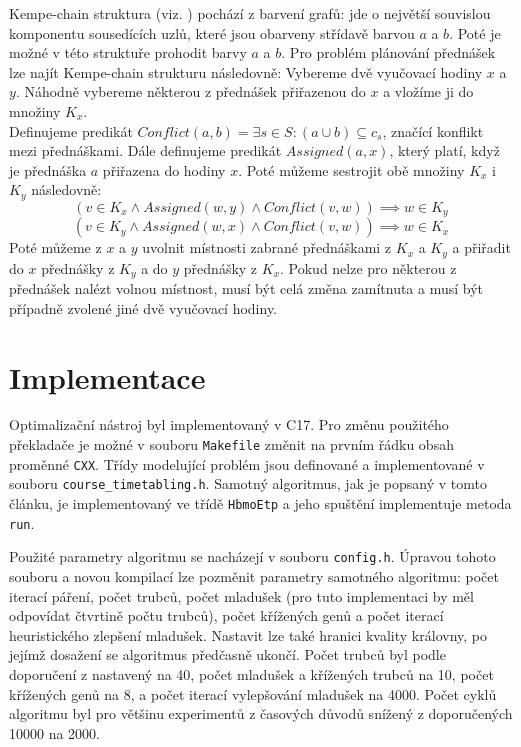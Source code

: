 \documentclass[12pt, a4paper]{article}
\def\CC{{C\nolinebreak[4]\hspace{-.05em}\raisebox{.4ex}{\tiny\bf ++}}}
\begin{document}
Kempe-chain struktura (viz. \cite{Kempe})
pochází z barvení grafů: jde o největší souvislou komponentu sousedících uzlů, které jsou obarveny střídavě barvou $a$ a $b$. Poté je možné v této struktuře prohodit barvy $a$ a $b$.
Pro problém plánování přednášek lze najít Kempe-chain strukturu následovně:
Vybereme dvě vyučovací hodiny $x$ a $y$.
Náhodně vybereme některou z přednášek při\-řa\-ze\-nou do $x$ a vložíme ji do množiny $K_x$.\\
Definujeme predikát $Conflict(a, b) = \exists s \in S: (a \cup b) \subseteq c_s$, značící konflikt mezi přednáškami.
Dále definujeme predikát $Assigned(a, x)$, který platí, když je přednáška $a$ přiřazena do hodiny $x$.
Poté můžeme sestrojit obě množiny $K_x$ i $K_y$ následovně:
$$(v \in K_x \land Assigned(w, y) \land Conflict(v, w)) \implies w \in K_y$$
$$(v \in K_y \land Assigned(w, x) \land Conflict(v, w)) \implies w \in K_x$$
Poté můžeme z $x$ a $y$ uvolnit místnosti zabrané přednáškami z $K_x$ a $K_y$ a přiřadit do $x$ přednášky z $K_y$ a do $y$ přednášky z $K_x$.
Pokud nelze pro některou z přednášek nalézt volnou místnost, musí být celá změna zamítnuta a musí být případně zvolené jiné dvě vyučovací hodiny.

\section{Implementace}
Optimalizační nástroj byl implementovaný v \CC{}17. Pro změnu použitého překladače je možné v souboru \texttt{Makefile} změnit na prvním řádku obsah proměnné \texttt{CXX}.
Třídy modelující problém jsou definované a implementované v souboru \texttt{course\_timetabling.h}.
Samotný algoritmus, jak je popsaný v tomto článku, je implementovaný ve třídě \texttt{HbmoEtp} a jeho spuštění
implementuje metoda \texttt{run}.

Použité parametry algoritmu se nacházejí v souboru \texttt{config.h}. Úpravou tohoto souboru a novou kompilací
lze pozměnit parametry samotného algoritmu: počet iterací páření, počet trubců, počet mladušek (pro tuto implementaci by měl odpovídat čtvrtině počtu trubců),
počet křížených genů a počet iterací heuristického zlepšení mladušek. Nastavit lze také hranici kvality královny, po jejímž dosažení se algoritmus předčasně ukončí.
Počet trubců byl podle doporučení z \cite{HoneyBee} nastavený na 40, počet mladušek a křížených trubců na 10, počet křížených genů na 8, a počet iterací
vylepšování mladušek na 4000. Počet cyklů algoritmu byl pro většinu experimentů z časových důvodů snížený z doporučených 10000 na 2000.
\end{document}
